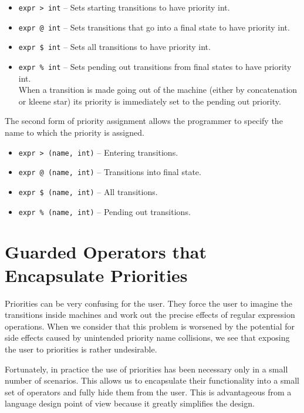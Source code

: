\documentclass[letterpaper,11pt,oneside]{book}
\begin{document}
\begin{itemize}
\setlength{\parskip}{0in}
\item \verb|expr > int| -- Sets starting transitions to have priority int.
\item \verb|expr @ int| -- Sets transitions that go into a final state to have priority int. 
\item \verb|expr $ int| -- Sets all transitions to have priority int.
\item \verb|expr % int| -- Sets pending out transitions from final states to
have priority int.\\ When a transition is made going out of the machine (either
by concatenation or kleene star) its priority is immediately set to the pending
out priority.  
\end{itemize}

The second form of priority assignment allows the programmer to specify the name
to which the priority is assigned.

\begin{itemize}
\setlength{\parskip}{0in}
\item \verb|expr > (name, int)| -- Entering transitions.
\item \verb|expr @ (name, int)| -- Transitions into final state.
\item \verb|expr $ (name, int)| -- All transitions.
\item \verb|expr % (name, int)| -- Pending out transitions.
\end{itemize}

\section{Guarded Operators that Encapsulate Priorities}

Priorities can be very confusing for the user. They force the user to imagine
the transitions inside machines and work out the precise effects of regular
expression operations. When we consider that this problem is worsened by the
potential for side effects caused by unintended priority name collisions, we
see that exposing the user to priorities is rather undesirable.

Fortunately, in practice the use of priorities has been necessary only in a
small number of scenarios.  This allows us to encapsulate their functionality
into a small set of operators and fully hide them from the user. This is
advantageous from a language design point of view because it greatly simplifies
the design.  
\end{document}
